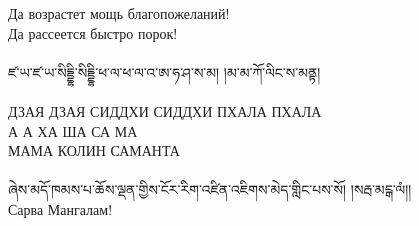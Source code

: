 Да возрастет мощь благопожеланий!\\
Да рассеется быстро порок!\\
\\
\ti ཛ་ཡ་ཛ་ཡ་སིདྡྷི་སིདྡྷི་ཕ་ལ་ཕ་ལ་འ་ཨ་ཧ་ཤ་ས་མ། །མ་མ་ཀོ་ལིང་ས་མནྟ། \\
\\
\ru ДЗАЯ ДЗАЯ СИДДХИ СИДДХИ ПХАЛА ПХАЛА\\
А А ХА ША СА МА\\
МАМА КОЛИН САМАНТА\\
\\
\scriptsize
\ti ཞེས་མདོ་ཁམས་པ་ཆོས་ལྡན་གྱིས་ངོར་རིག་འཛིན་འཇིགས་མེད་གླིང་པས་སོ། །སརྦ་མངྒ་ལཾ།།\\
\ru Сарва Мангалам!
\normalsize




